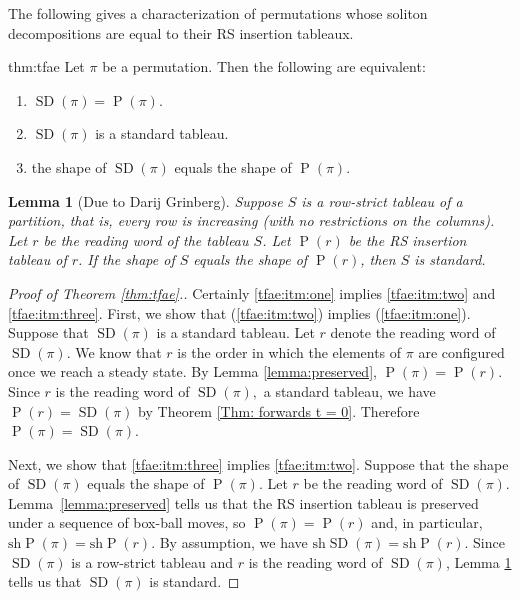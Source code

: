 \documentclass[submission]{FPSAC2021}
\theoremstyle{plain}
\newtheorem{lemma}[theorem]{Lemma}
\theoremstyle{definition}
\numberwithin{equation}{section}
\DeclareMathOperator{\SDself}{SD}
\DeclareMathOperator{\Ptself}{P}
\newcommand{\SD}[1]{\SDself(#1)}
\renewcommand{\P}[1]{\Ptself(#1)}
\begin{document}
The following gives a characterization of permutations whose soliton decompositions are equal to their RS insertion tableaux.




\begin{reptheorem}{thm:tfae} 
Let $\pi$ be a permutation. Then 
the following are equivalent:
    \begin{enumerate}
        \item 
        $\SD{\pi} = \P{\pi}.$
        \item 
        $\SD{\pi}$ is a standard tableau.
        \item 
        the shape of $\SD{\pi}$ equals the shape of $\P{\pi}$.
    \end{enumerate}
    \end{reptheorem}

\begin{lemma}[Due to Darij Grinberg]
\label{lem: Grinberg}
Suppose $S$ is a row-strict tableau of a partition, that is, every row is increasing (with no restrictions on the columns). 
Let $r$ be the reading word of the tableau $S$.
Let $\P{r}$ be the RS insertion tableau of $r$. 
If the shape of $S$ equals the shape of $\P{r}$, then $S$ is standard.
\end{lemma}

\begin{proof}[Proof of Theorem \ref{thm:tfae}.]
Certainly \eqref{tfae:itm:one} implies \eqref{tfae:itm:two} and \eqref{tfae:itm:three}. First, we show that (\ref{tfae:itm:two}) implies (\ref{tfae:itm:one}). Suppose that $\SD{\pi}$ is a standard tableau. Let $r$ denote the reading word of $\SD{\pi}.$ We know that $r$ is the order in which the elements of $\pi$ are configured once we reach a steady state. 
By Lemma \ref{lemma:preserved}, $\P{\pi} = \P{r}.$
Since $r$ is the reading word of $\SD{\pi},$ a standard tableau, we have $\P{r} = \SD{\pi}$ by Theorem \ref{Thm: forwards t = 0}. 
Therefore $\P{\pi}=\SD{\pi}$.
        
Next, we show that  \eqref{tfae:itm:three} implies  \eqref{tfae:itm:two}. Suppose that the shape of $\SD{\pi}$ equals the shape of $\P{\pi}$. Let $r$ be the reading word of $\SD{\pi}$. 
Lemma~\ref{lemma:preserved} 
tells us that the RS insertion tableau is preserved under a sequence of box-ball moves, so $\P{\pi}=\P{r}$ and, in particular, $\text{sh}\P{\pi}=\text{sh}\P{r}$. By assumption, we have  $\text{sh}\SD{\pi}=\text{sh}\P{r}$. Since $\SD{\pi}$ is a row-strict tableau and $r$ is the reading word of $\SD{\pi}$, Lemma \ref{lem: Grinberg} tells us that $\SD{\pi}$ is standard.
\end{proof}
    
\end{document}

